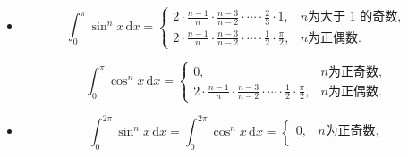 \documentclass[../book.tex]{subfiles}
\begin{document}
\begin{enumerate}
\begin{itemize}
\[\begin{cases}
                          \displaystyle
                          \frac{n-1}{n}
                          \cdot
                          \frac{n-3}{n-2}
                          \cdot
                          \cdots
                          \cdot
                          \frac{1}{2}
                          \cdot
                          \frac{\pi}{2},
                          & n \text{为正偶数}.
                      \end{cases}
            \]

            \item
            \[
                \int_{0}^{\pi} \sin^{n} x \,\mathrm{d}x
                =
                \begin{cases}
                    \displaystyle
                    2
                    \cdot
                    \frac{n-1}{n}
                    \cdot
                    \frac{n-3}{n-2}
                    \cdot
                    \cdots
                    \cdot
                    \frac{2}{3}
                    \cdot
                    1,
                    & n \text{为大于 1 的奇数}, \\[1.2em]

                    \displaystyle
                    2
                    \cdot
                    \frac{n-1}{n}
                    \cdot
                    \frac{n-3}{n-2}
                    \cdot
                    \cdots
                    \cdot
                    \frac{1}{2}
                    \cdot
                    \frac{\pi}{2},
                    & n \text{为正偶数}.
                \end{cases}
            \]

            \[
                \int_{0}^{\pi} \cos^{n} x \,\mathrm{d}x
                =
                \begin{cases}
                    0,
                    & n \text{为正奇数}, \\[0.8em]

                    \displaystyle
                    2
                    \cdot
                    \frac{n-1}{n}
                    \cdot
                    \frac{n-3}{n-2}
                    \cdot
                    \cdots
                    \cdot
                    \frac{1}{2}
                    \cdot
                    \frac{\pi}{2},
                    & n \text{为正偶数}.
                \end{cases}
            \]

            \item
            \[
                \int_{0}^{2\pi} \sin^{n} x \,\mathrm{d}x
                =
                \int_{0}^{2\pi} \cos^{n} x \,\mathrm{d}x
                =
                \begin{cases}
                    0,
                    & n \text{为正奇数}, \\[0.8em]


\end{cases}\]
\end{itemize}
\end{enumerate}
\end{document}
